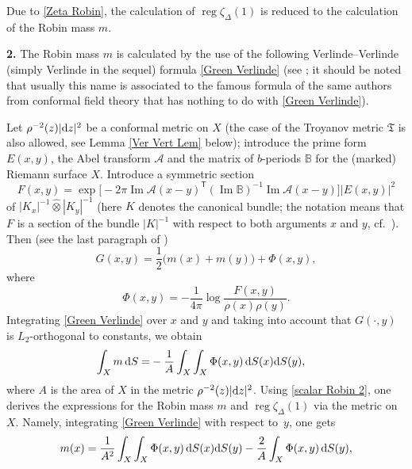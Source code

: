 \documentclass[pdftex]{sigma}
\numberwithin{equation}{section}
\theoremstyle{definition}
\begin{document}
Due to \eqref{Zeta Robin}, the calculation of $\operatorname{reg}\zeta_\Delta(1)$ is reduced to the calculation of the Robin mass $m$.


{\bf 2.} The Robin mass $m$ is calculated by the use of the following Verlinde--Verlinde (simply Verlinde in the sequel) formula \eqref{Green Verlinde} (see \cite[equations~(5.7)--(5.10)]{Ver}; it should be noted that usually this name is associated to the famous formula of the same authors from conformal field theory that has nothing to do with \eqref{Green Verlinde}).

Let $\rho^{-2}(z)|{\rm d}z|^2$ be a conformal metric on $X$ (the case of the Troyanov metric $\mathfrak{T}$ is also allowed, see Lemma \ref{Ver Vert Lem} below); introduce the prime form $E(x,y)$, the Abel transform $\mathscr{A}$ and the matrix of $b$-periods $\mathbb{B}$ for the (marked) Riemann surface $X$. Introduce a symmetric section
\begin{equation}
\label{Verlinde}
F(x,y)=\exp\bigl[-2\pi\operatorname{Im}\mathscr{A}(x-y)^{\mathsf T} (\operatorname{Im}\mathbb{B})^{-1}\operatorname{Im}\mathscr{A}(x-y)\bigr]|E(x,y)|^2
\end{equation}
of $|K_x|^{-1}\hat{\otimes}|K_y|^{-1}$ (here $K$ denotes the canonical bundle; the notation means that $F$ is a section of the bundle $|K|^{-1}$ with respect to both arguments $x$ and $y$, cf.\ \cite[p.\ 23]{Fay}). Then (see the last paragraph of \cite[Section~5]{Ver})
\begin{equation}\label{Green Verlinde}
G(x,y)=\frac{1}{2}\bigl(m(x)+m(y)\bigr)+\Phi(x,y),
\end{equation}
where
\begin{equation}\label{Phi func}
\Phi(x,y)=-\frac{1}{4\pi}\log \frac{F(x,y)}{\rho(x)\rho(y)}.
\end{equation}
Integrating \eqref{Green Verlinde} over $x$ and $y$ and taking into account that $G(\cdot,y)$ is $L_2$-orthogonal to constants, we obtain
\begin{align}\label{scalar Robin 2}
\int_{X}m\,{\rm d }S=&-\frac{1}{A}\int_{X}\int_{X}\Phi(x,y)\, {\rm d }S(x){\rm d }S(y),
\end{align}
where $A$ is the area of $X$ in the metric $\rho^{-2}(z)|{\rm d}z|^2$. Using \eqref{scalar Robin 2}, one derives the expressions for the Robin mass $m$ and $\operatorname{reg}\zeta_\Delta(1)$ via the metric on $X$. Namely, integrating \eqref{Green Verlinde} with respect to~$y$, one gets
\[%
m(x)=\frac{1}{A^2}\int_X \int_X\Phi(x, y) \,{\rm d }S(x) {\rm d }S(y)-\frac{2}{A}\int_X\Phi(x, y)\, {\rm d }S(y),
\]
\end{document}
